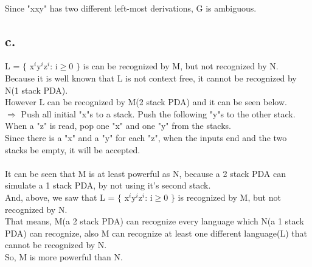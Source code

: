 \documentclass[12pt]{article}
\begin{document}
 \\
Since "xxy" has two different left-most derivations, G is ambiguous. \\

\subsection*{c.}
L = $\lbrace$ x$^i$y$^i$z$^i$: i$\geq$0 $\rbrace$ is can be recognized by M, but not recognized by N. \\
Because it is well known that L is not context free, it cannot be recognized by N(1 stack PDA). \\
However L can be recognized by M(2 stack PDA) and it can be seen below. \\
$\Rightarrow$ Push all initial "x"s to a stack. Push the following "y"s to the other stack. \\
When a "z" is read, pop one "x" and one "y" from the stacks. \\
Since there is a "x" and a "y" for each "z", when the inputs end and the two stacks be empty, it will be accepted. \\
\\
It can be seen that M is at least powerful as N, because a 2 stack PDA can simulate a
1 stack PDA, by not using it's second stack. \\
And, above, we saw that L = $\lbrace$ x$^i$y$^i$z$^i$: i$\geq$0 $\rbrace$ is recognized by M, but not recognized by N. \\
That means, M(a 2 stack PDA) can recognize every language which N(a 1 stack PDA) can recognize, also M can recognize at least one different language(L) that cannot be recognized by N. \\
So, M is more powerful than N. \\
\end{document}
